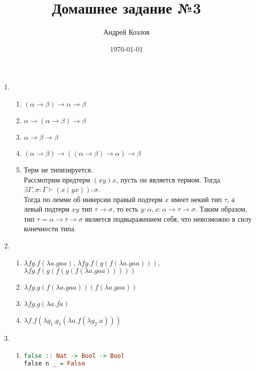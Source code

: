 \documentclass[12pt,a4paper]{article}
\begin{document}
\title{Домашнее задание №3}
\author{Андрей Козлов}
\date{\today}

\maketitle

\begin{enumerate}
\item {
	\begin{enumerate}
		\item $(\alpha \rightarrow \beta) \rightarrow \alpha \rightarrow \beta$
		\item $\alpha \rightarrow (\alpha \rightarrow \beta) \rightarrow \beta$
		\item $\alpha \rightarrow \beta \rightarrow \beta$
		\item $(\alpha \rightarrow \beta) \rightarrow ((\alpha \rightarrow \beta) \rightarrow \alpha) \rightarrow \beta$
		\item {
			Терм не типизируется.\\
			Рассмотрим предтерм $(x y) x$, пусть он является термом. Тогда $\exists \Gamma, \sigma \colon \Gamma \vdash (x (y x)) \colon \sigma$.\\
			Тогда по лемме об инверсии правый подтерм $x$ имеет некий тип $\tau$, а левый подтерм $x y$ тип $\tau \rightarrow \sigma$, то есть $y \colon \alpha, x \colon \alpha \rightarrow \tau \rightarrow \sigma$. Таким образом, тип $\tau =  \alpha \rightarrow \tau \rightarrow \sigma$ является подвыражением себя, что невозможно в силу конечности типа.
		}
	\end{enumerate}
}
\item {
	\begin{enumerate}
		\item $\lambda f g . f (\lambda a . g a a)$, $\lambda f g . f (g (f (\lambda a . g a a)))$, $\lambda f g . f (g (f (g (f (\lambda a . g a a)))))$
		\item $\lambda f g . g (f (\lambda a . g a a)) (f (\lambda a . g a a))$
		\item $\lambda f g . g (\lambda a . f a)$
		\item $\lambda f . f (\lambda g_1 . g_1 (\lambda a . f (\lambda g_2 . a)))$
	\end{enumerate}
}
\item
{
	\begin{enumerate}
		\item {
			\begin{lstlisting}[language=Haskell]
false :: Nat -> Bool -> Bool
false n _ = False


\end{lstlisting}}
\end{enumerate}}
\end{enumerate}
\end{document}
